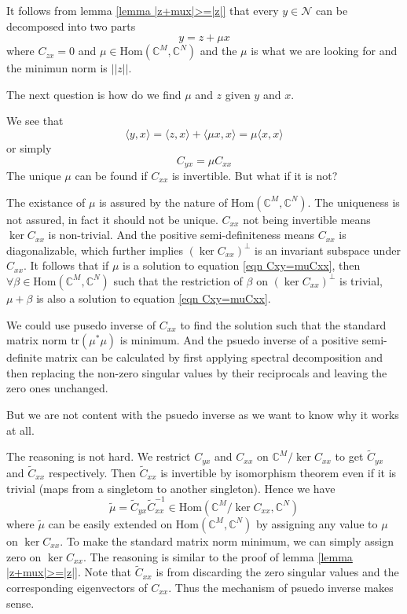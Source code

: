 \documentclass[12pt]{article}
\theoremstyle{definition}
\begin{document}
It follows from lemma \ref{lemma |z+mux|>=|z|} that every $y\in\mathcal{N}$ can be decomposed into two parts
$$y=z+\mu x$$
where $C_{zx}=0$ and $\mu\in\mbox{Hom}\left(\mathbb{C}^M, \mathbb{C}^N\right)$ and the $\mu$ is what we are looking for and the minimun norm is $||z||$.

The next question is how do we find $\mu$ and $z$ given $y$ and $x$.

We see that
$$\langle y,x\rangle= \langle z,x\rangle+\langle \mu x,x\rangle=\mu\langle x,x\rangle$$
or simply
\begin{equation}\label{eqn Cxy=muCxx}
	C_{yx}=\mu C_{xx}
\end{equation}
The unique $\mu$ can be found if $C_{xx}$ is invertible. But what if it is not?

The existance of $\mu$ is assured by the nature of $\mbox{Hom}\left(\mathbb{C}^M,\mathbb{C}^N \right)$. The uniqueness is not assured, in fact it should not be unique. $C_{xx}$ not being invertible means $\ker C_{xx}$ is non-trivial. And the positive semi-definiteness means $C_{xx}$ is diagonalizable, which further implies $\left(\ker C_{xx} \right)^{\perp}$ is an invariant subspace under $C_{xx}$. It follows that if $\mu$ is a solution to equation \ref{eqn Cxy=muCxx}, then $\forall \beta\in\mbox{Hom}\left(\mathbb{C}^M,\mathbb{C}^N \right)$ such that the restriction of $\beta$ on $\left(\ker C_{xx} \right)^{\perp}$ is trivial, $\mu + \beta$ is also a solution to equation \ref{eqn Cxy=muCxx}.

We could use pusedo inverse of $C_{xx}$ to find the solution such that the standard matrix norm $\mbox{tr}(\mu^*\mu)$ is minimum. And the psuedo inverse of a positive semi-definite matrix can be calculated by first applying spectral decomposition and then replacing the non-zero singular values by their reciprocals and leaving the zero ones unchanged.

But we are not content with the psuedo inverse as we want to know why it works at all.

The reasoning is not hard. We restrict $C_{yx}$ and $C_{xx}$ on $\mathbb{C}^M/\ker C_{xx}$ to get $\tilde{C}_{yx}$ and $\tilde{C}_{xx}$ respectively. Then $\tilde{C}_{xx}$ is invertible by isomorphism theorem even if it is trivial (maps from a singletom to another singleton). Hence we have
$$\tilde{\mu}=\tilde{C}_{yx}\tilde{C}_{xx}^{-1}\in\mbox{Hom}\left(\mathbb{C}^M/\ker C_{xx}, \mathbb{C}^N \right)$$
where $\tilde{\mu}$ can be easily extended on $\mbox{Hom}\left(\mathbb{C}^M,\mathbb{C}^N \right)$ by assigning any value to $\mu$ on $\ker C_{xx}$. To make the standard matrix norm minimum, we can simply assign zero on $\ker C_{xx}$. The reasoning is similar to the proof of lemma \ref{lemma |z+mux|>=|z|}. Note that $\tilde{C}_{xx}$ is from discarding the zero singular values and the corresponding eigenvectors of $C_{xx}$. Thus the mechanism of psuedo inverse makes sense.
\end{document}
